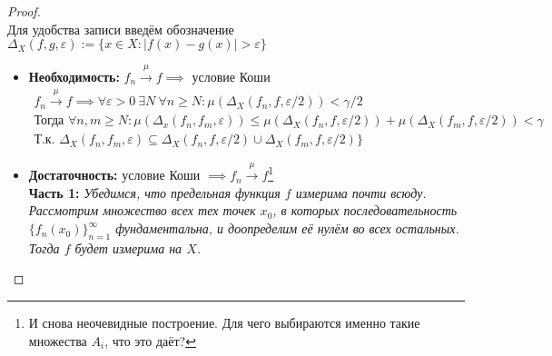 \documentclass[11pt,a4paper]{report}
\def\eps{\varepsilon}
\theoremstyle{definition}
\theoremstyle{definition}
\theoremstyle{definition}
\begin{document}
		\begin{proof}$  $\\
			Для удобства записи введём обозначение $ \Delta_{X}(f, g, \eps) := \{ x \in X: |f(x) - g(x)| > \eps \} $
			\begin{itemize}
				\item \textbf{Необходимость:} $ f_{n} \xrightarrow{\mu} f \implies $ условие Коши
					\begin{gather*}
						f_{n} \xrightarrow{\mu} f \implies \forall \eps > 0\ \exists N\ \forall n \ge N: \mu(\Delta_{X}(f_{n}, f, \eps/2)) < \gamma/2\\
						\mbox{Тогда } \forall n, m \ge N: \mu(\Delta_{x}(f_{n}, f_{m}, \eps)) \le \mu(\Delta_{X}(f_{n}, f, \eps/2)) + \mu(\Delta_{X}(f_{m}, f, \eps/2)) < \gamma\\
						\mbox{Т.к. } \Delta_{X}(f_{n}, f_{m}, \eps) \subseteq \Delta_{X}(f_{n}, f, \eps/2) \cup \Delta_{X}(f_{m}, f, \eps/2) \} 
					\end{gather*}
				\item \textbf{Достаточность:} условие Коши $ \implies f_{n} \xrightarrow{\mu} f $\footnote{И снова неочевидные построение. Для чего выбираются именно такие множества $ A_{i} $, что это даёт?}\\
				\textbf{Часть 1:} \textit{Убедимся, что предельная функция $ f $ измерима почти всюду. Рассмотрим множество всех тех точек $ x_{0} $, в которых последовательность $ \{f_{n}(x_{0})\}_{n=1}^{\infty} $ фундаментальна, и доопределим её нулём во всех остальных. Тогда $ f $ будет измерима на $ X $.}\\
				

\end{itemize}
\end{proof}
\end{document}
